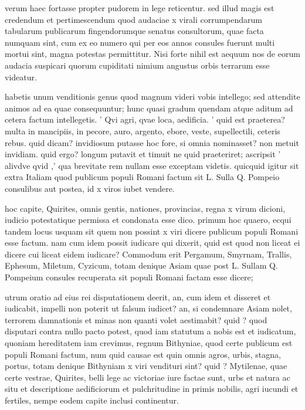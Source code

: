  verum haec fortasse propter pudorem in lege reticentur. sed illud magis est credendum et pertimescendum quod audaciae x virali corrumpendarum tabularum publicarum fingendorumque senatus consultorum, quae facta numquam sint, cum ex eo numero qui per eos annos consules fuerunt multi mortui sint, magna potestas permittitur. Nisi forte nihil est aequum nos de eorum audacia suspicari quorum cupiditati nimium angustus orbis terrarum esse videatur.

 habetis unum venditionis genus quod magnum videri vobis intellego; sed attendite animos ad ea quae consequuntur; hunc quasi gradum quendam atque aditum ad cetera factum intellegetis. ' Qvi agri, qvae loca, aedificia. ' quid est praeterea? multa in mancipiis, in pecore, auro, argento, ebore, veste, supellectili, ceteris rebus. quid dicam? invidiosum putasse hoc fore, si omnia nominasset? non metuit invidiam. quid ergo? longum putavit et timuit ne quid praeteriret; ascripsit ' alivdve qvid ,' qua brevitate rem nullam esse exceptam videtis. quicquid igitur sit extra Italiam quod publicum populi Romani factum sit L. Sulla Q. Pompeio consulibus aut postea, id x viros iubet vendere.

 hoc capite, Quirites, omnis gentis, nationes, provincias, regna x virum dicioni, iudicio potestatique permissa et condonata esse dico. primum hoc quaero, ecqui tandem locus usquam sit quem non possint x viri dicere publicum populi Romani esse factum. nam cum idem possit iudicare qui dixerit, quid est quod non liceat ei dicere cui liceat eidem iudicare? Commodum erit Pergamum, Smyrnam, Trallis, Ephesum, Miletum, Cyzicum, totam denique Asiam quae post L. Sullam Q. Pompeium consules recuperata sit populi Romani factam esse dicere;

 utrum oratio ad eius rei disputationem deerit, an, cum idem et disseret et iudicabit, impelli non poterit ut falsum iudicet? an, si condemnare Asiam nolet, terrorem damnationis et minas non quanti volet aestimabit? quid ? quod disputari contra nullo pacto potest, quod iam statutum a nobis est et iudicatum, quoniam hereditatem iam crevimus, regnum Bithyniae, quod certe publicum est populi Romani factum, num quid causae est quin omnis agros, urbis, stagna, portus, totam denique Bithyniam x viri vendituri sint? quid ? Mytilenae, quae certe vestrae, Quirites, belli lege ac victoriae iure factae sunt, urbs et natura ac situ et descriptione aedificiorum et pulchritudine in primis nobilis, agri iucundi et fertiles, nempe eodem capite inclusi continentur.

